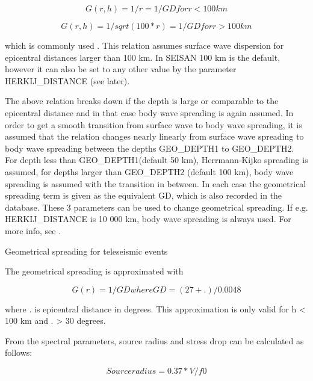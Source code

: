 \begin{displaymath}
G(r,h) = 1/r =1/GD for r < 100 km
\end{displaymath}

\begin{displaymath}
G(r,h) = 1/sqrt(100*r) =1/GD for r > 100 km 
\end{displaymath}

which is commonly used \citep{herrmann1985,herrmann1983}.  This relation assumes surface wave dispersion for epicentral distances larger than 100 km. In SEISAN 100 km is the default, however it can also be set to any other value by the parameter HERKIJ\_DISTANCE (see later). 

The above relation breaks down if the depth is large or comparable to the epicentral distance and in that case body wave spreading is again assumed. In order to get a smooth transition from surface wave to body wave spreading, it is assumed that the relation changes nearly linearly from surface wave spreading to body wave spreading between the depths GEO\_DEPTH1 to GEO\_DEPTH2. For depth less than GEO\_DEPTH1(default 50 km), Herrmann-Kijko spreading is assumed, for depths larger than GEO\_DEPTH2 (default 100 km), body wave spreading is assumed with the transition in between. In each case the geometrical spreading term is given as the equivalent GD, which is also recorded in the database. These 3 parameters can be used to change geometrical spreading. If e.g. HERKIJ\_DISTANCE is 10 000 km, body wave spreading is always used. For more info, see \citep{havskov2010}. 


Geometrical spreading for teleseismic events 

The geometrical spreading is approximated with \citep{havskov2010} 

\begin{displaymath}
G(r)=1/GD where GD =(27 + .)/0.0048 
\end{displaymath}

where . is epicentral distance in degrees. This approximation is only valid for h < 100 km and . > 30 degrees. 

From the spectral parameters, source radius and stress drop can be calculated as follows: 

\begin{displaymath}
Source radius = 0.37 * V /f0 
\end{displaymath}

